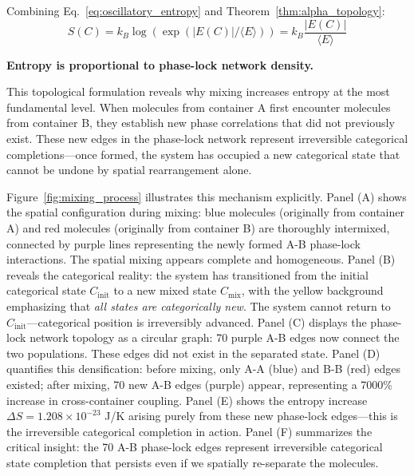 \documentclass[twocolumn,superscriptaddress,prb,10pt]{revtex4-2}
\theoremstyle{definition}
\theoremstyle{remark}
\begin{document}
Combining Eq.~\eqref{eq:oscillatory_entropy} and Theorem~\ref{thm:alpha_topology}:
\begin{equation}
S(C) = k_B \log(\exp(|E(C)|/\langle E \rangle)) = k_B \frac{|E(C)|}{\langle E \rangle}
\label{eq:topological_entropy}
\end{equation}

\textbf{Entropy is proportional to phase-lock network density.}

This topological formulation reveals why mixing increases entropy at the most fundamental level. When molecules from container A first encounter molecules from container B, they establish new phase correlations that did not previously exist. These new edges in the phase-lock network represent irreversible categorical completions—once formed, the system has occupied a new categorical state that cannot be undone by spatial rearrangement alone.

Figure~\ref{fig:mixing_process} illustrates this mechanism explicitly. Panel (A) shows the spatial configuration during mixing: blue molecules (originally from container A) and red molecules (originally from container B) are thoroughly intermixed, connected by purple lines representing the newly formed A-B phase-lock interactions. The spatial mixing appears complete and homogeneous. Panel (B) reveals the categorical reality: the system has transitioned from the initial categorical state $C_{\text{init}}$ to a new mixed state $C_{\text{mix}}$, with the yellow background emphasizing that \emph{all states are categorically new}. The system cannot return to $C_{\text{init}}$—categorical position is irreversibly advanced. Panel (C) displays the phase-lock network topology as a circular graph: 70 purple A-B edges now connect the two populations. These edges did not exist in the separated state. Panel (D) quantifies this densification: before mixing, only A-A (blue) and B-B (red) edges existed; after mixing, 70 new A-B edges (purple) appear, representing a $7000\%$ increase in cross-container coupling. Panel (E) shows the entropy increase $\Delta S = 1.208 \times 10^{-23}$ J/K arising purely from these new phase-lock edges—this is the irreversible categorical completion in action. Panel (F) summarizes the critical insight: the 70 A-B phase-lock edges represent irreversible categorical state completion that persists even if we spatially re-separate the molecules.
\end{document}

